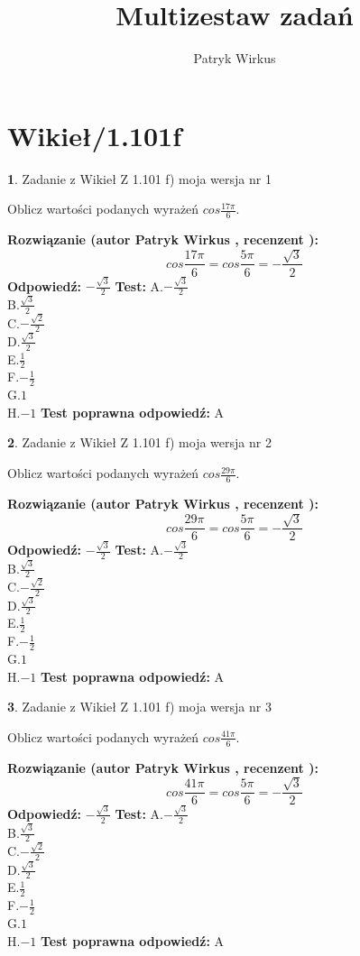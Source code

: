 \documentclass[12pt, a4paper]{article}
\title{Multizestaw zadań}
\author{Patryk Wirkus}
\date{}
\theoremstyle{definition} %
\newtheorem{zad}{}
\newcommand{\kategoria}[1]{\section{#1}}
\newcommand{\zadStart}[1]{\begin{zad}#1\newline}
\newcommand{\zadStop}{\end{zad}}
\newcommand{\rozwStart}[2]{\noindent \textbf{Rozwiązanie (autor #1 , recenzent #2): }\newline}
\newcommand{\rozwStop}{\newline}
\newcommand{\odpStart}{\noindent \textbf{Odpowiedź:}\newline}
\newcommand{\odpStop}{\newline}
\newcommand{\testStart}{\noindent \textbf{Test:}\newline}
\newcommand{\testStop}{\newline}
\newcommand{\kluczStart}{\noindent \textbf{Test poprawna odpowiedź:}\newline}
\newcommand{\kluczStop}{\newline}
\begin{document}
\maketitle

\kategoria{Wikieł/1.101f}


\zadStart{Zadanie z Wikieł Z 1.101 f) moja wersja nr 1}

Oblicz wartości podanych wyrażeń $cos \frac{17\pi}{6}$.
\zadStop
\rozwStart{Patryk Wirkus}{}
$$cos \frac{17\pi}{6} = cos \frac{5\pi}{6} = -\frac{\sqrt{3}}{2}$$
\rozwStop
\odpStart
$-\frac{\sqrt{3}}{2}$
\odpStop
\testStart
A.$-\frac{\sqrt{3}}{2}$\\
B.$\frac{\sqrt{3}}{2}$\\
C.$-\frac{\sqrt{2}}{2}$\\
D.$\frac{\sqrt{3}}{2}$\\
E.$\frac{1}{2}$\\
F.$-\frac{1}{2}$\\
G.$1$\\
H.$-1$
\testStop
\kluczStart
A
\kluczStop



\zadStart{Zadanie z Wikieł Z 1.101 f) moja wersja nr 2}

Oblicz wartości podanych wyrażeń $cos \frac{29\pi}{6}$.
\zadStop
\rozwStart{Patryk Wirkus}{}
$$cos \frac{29\pi}{6} = cos \frac{5\pi}{6} = -\frac{\sqrt{3}}{2}$$
\rozwStop
\odpStart
$-\frac{\sqrt{3}}{2}$
\odpStop
\testStart
A.$-\frac{\sqrt{3}}{2}$\\
B.$\frac{\sqrt{3}}{2}$\\
C.$-\frac{\sqrt{2}}{2}$\\
D.$\frac{\sqrt{3}}{2}$\\
E.$\frac{1}{2}$\\
F.$-\frac{1}{2}$\\
G.$1$\\
H.$-1$
\testStop
\kluczStart
A
\kluczStop



\zadStart{Zadanie z Wikieł Z 1.101 f) moja wersja nr 3}

Oblicz wartości podanych wyrażeń $cos \frac{41\pi}{6}$.
\zadStop
\rozwStart{Patryk Wirkus}{}
$$cos \frac{41\pi}{6} = cos \frac{5\pi}{6} = -\frac{\sqrt{3}}{2}$$
\rozwStop
\odpStart
$-\frac{\sqrt{3}}{2}$
\odpStop
\testStart
A.$-\frac{\sqrt{3}}{2}$\\
B.$\frac{\sqrt{3}}{2}$\\
C.$-\frac{\sqrt{2}}{2}$\\
D.$\frac{\sqrt{3}}{2}$\\
E.$\frac{1}{2}$\\
F.$-\frac{1}{2}$\\
G.$1$\\
H.$-1$
\testStop
\kluczStart
A
\kluczStop
\end{document}
